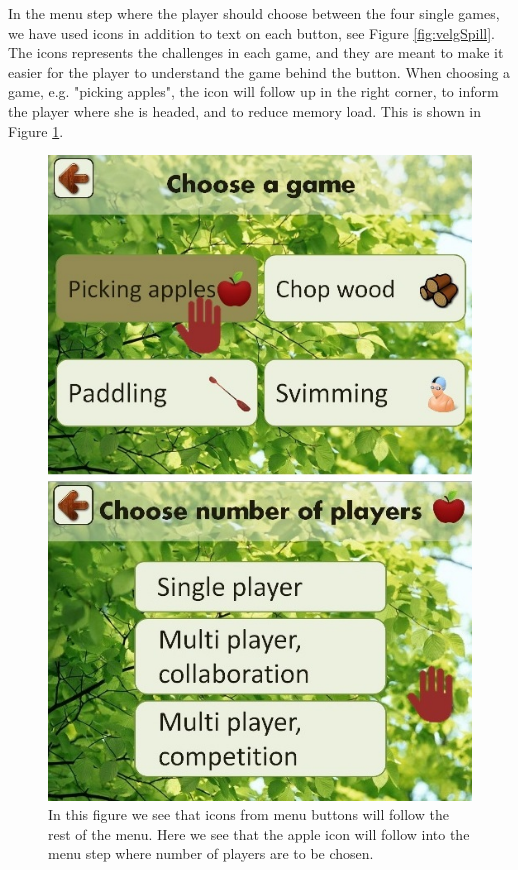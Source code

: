 In the menu step where the player should choose between the four single games, we have used icons in addition to text on each button, see Figure \ref{fig:velgSpill}. The icons represents the challenges in each game, and they are meant to make it easier for the player to understand the game behind the button. When choosing a game, e.g. "picking apples", the icon will follow up in the right corner, to inform the player where she is headed, and to reduce memory load. This is shown in Figure \ref{fig:iconEple}.  

\begin{figure} [H]
\centering
\includegraphics[scale=0.5]{menuIconApple.jpg}
\caption[Menu - use of icons]{In this figure we see that icons from menu buttons will follow the rest of the menu. Here we see that the apple icon will follow into the menu step where number of players are to be chosen.}
\label{fig:iconEple}
\end{figure} 
     

